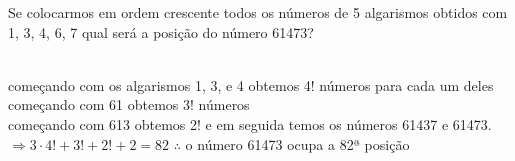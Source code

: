 \begin{ex}
Se colocarmos em ordem crescente todos os números de 5 algarismos obtidos com 1, 3, 4, 6, 7 qual será a posição do número 61473?
  \begin{sol}
    \phantom{A} \\
    começando com os algarismos 1, 3, e 4 obtemos 4! números para cada um deles\\
    começando com 61 obtemos 3! números  \\   começando com 613 obtemos 2! e em seguida temos os números 61437 e 61473.\\ $\Longrightarrow 3\cdot 4!+3!+2!+2=82$\hspace{0,2cm} $\therefore$
    o número 61473 ocupa a 82ª posição
  \end{sol}
\end{ex}
